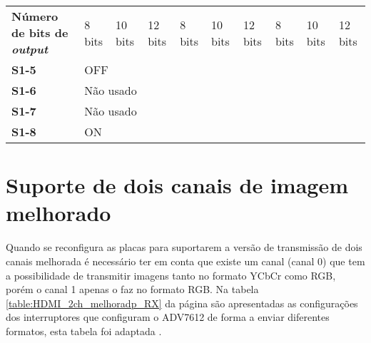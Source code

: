 \begin{table}[h!]
{\begin{tabular}{@{}llllllllll@{}}
			\multicolumn{1}{l|}{\textbf{Número de bits de \textit{output}}} & 8 bits & 10 bits & 12 bits & 8 bits & 10 bits & 12 bits & 8 bits & 10 bits & 12 bits \\
			\multicolumn{1}{l|}{\textbf{S1-5}} & \multicolumn{9}{l}{OFF} \\
			\multicolumn{1}{l|}{\textbf{S1-6}} & \multicolumn{9}{l}{Não usado} \\
			\multicolumn{1}{l|}{\textbf{S1-7}} & \multicolumn{9}{l}{Não usado} \\
			\multicolumn{1}{l|}{\textbf{S1-8}} & \multicolumn{9}{l}{ON} \\ \bottomrule
		\end{tabular}%
	}
\end{table}

\section{Suporte de dois canais de imagem melhorado} \label{sec:HDMIconfigMelhorado_switches}

Quando se reconfigura as placas para suportarem a versão de transmissão de dois canais melhorada é necessário ter em conta que existe um canal (canal 0) que tem a possibilidade de transmitir imagens tanto no formato YCbCr como RGB, porém o canal 1 apenas o faz no formato RGB. Na tabela \ref{table:HDMI_2ch_melhoradp_RX} da página \pageref{table:HDMI_2ch_melhoradp_RX} são apresentadas as configurações dos interruptores que configuram o ADV7612 de forma a enviar diferentes formatos, esta tabela foi adaptada \cite{R013}.

